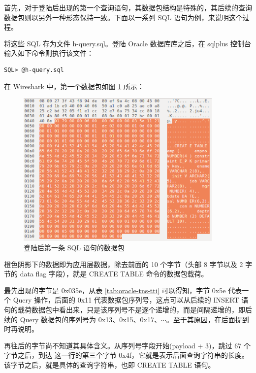 首先，对于登陆后出现的第一个查询语句，其数据包结构是特殊的，其后续的查询数据包则以另外一种形态保持一致。下面以一系列 SQL 语句为例，来说明这个过程。



将这些 SQL 存为文件 {\ff h-query.sql}。登陆 Oracle 数据库库之后，在 sqlplus 控制台输入如下命令则执行该文件：

\begin{lstlisting}
SQL> @h-query.sql
\end{lstlisting}

在 Wireshark 中，第一个数据包如图 \ref{fig:tns-first-sql} 所示：

\begin{figure}[ht!]
    \caption{登陆后第一条 SQL 语句的数据包}
    \label{fig:tns-first-sql}
    \centering
    \includegraphics[width=0.9\textwidth]{tns-first-sql.png}
\end{figure}

橙色阴影下的数据即为应用层数据，除去前面的 10 个字节（头部 8 字节以及 2 字节的 data flag 字段），就是 {\cf CREATE TABLE} 命令的数据包载荷。

最先出现的字节是 {\cf 0x035e}，从表 \ref{tab:oracle-tns-tti} 可以得知，字节 {\cf 0x5e} 代表一个 Query 操作，后面的 {\cf 0x11} 代表数据包序列号，这点可以从后续的 {\cf INSERT} 语句的载荷数据包中看出来，只是该序列号不是逐个递增的，而是间隔递增的，即后续的 Query 数据包的序列号为 {\cf 0x13}、{\cf 0x15}、{\cf 0x17}、$\cdots$。至于其原因，在后面提到时再说明。

再往后的字节尚不知道其具体含义。从序列号字段开始(payload + 3)，跳过 67 个字节之后，到达 {} 这一行的第三个字节 {\cf 0x4f}，它就是表示后面查询字符串的长度。该字节之后，就是具体的查询字符串，也即 {\cf CREATE TABLE} 语句。

